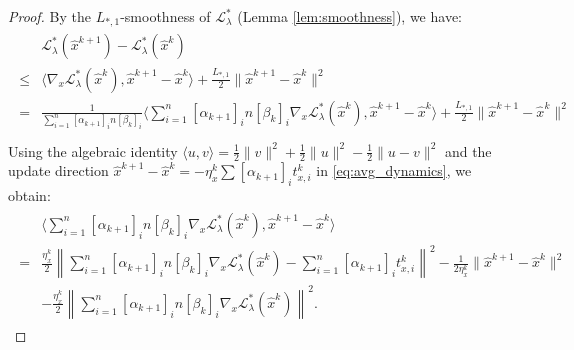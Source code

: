 \documentclass{article}
\theoremstyle{plain}
\theoremstyle{definition}
\theoremstyle{remark}
\begin{document}
\begin{proof}
By the $L_{*,1}$-smoothness of $\mathcal{L}_{\lambda}^{*}$ (Lemma \ref{lem:smoothness}), we have:
	\begin{align}\label{opt_Lag_de}
		\begin{aligned}
			&\mathcal{L}_{\lambda}^{*}(\hat{x}^{k+1})- \mathcal{L}_{\lambda}^{*}(\hat{x}^{k})\\
			\leq 
			& \langle\nabla_{x}\mathcal{L}_{\lambda}^{*}(\hat{x}^{k}),\hat{x}^{k+1}-\hat{x}^{k}\rangle+\frac{L_{*,1}}{2}\|\hat{x}^{k+1}-\hat{x}^{k}\|^{2}\\
			=
			&\frac{1}{\sum_{i=1}^{n}[\alpha_{k+1}]_{i} n[\beta_{k}]_{i}}\Big\langle\sum_{i=1}^{n}[\alpha_{k+1}]_{i} n[\beta_{k}]_{i}\nabla_{x}\mathcal{L}_{\lambda}^{*}(\hat{x}^{k}),\hat{x}^{k+1}-\hat{x}^{k}\Big\rangle+\frac{L_{*,1}}{2}\|\hat{x}^{k+1}-\hat{x}^{k}\|^{2}\\
		\end{aligned}
	\end{align}
Using the algebraic identity $\langle u, v \rangle = \frac{1}{2}\|v\|^2 + \frac{1}{2}\|u\|^2 - \frac{1}{2}\|u - v\|^2$ and the update direction $\hat{x}^{k+1} - \hat{x}^k = - \eta_x^k \sum [\alpha_{k+1}]_i t_{x,i}^k$ in \eqref{eq:avg_dynamics}, we obtain:
	\begin{align}\label{opt_Lag_de_1}
    \begin{aligned}
		&\Big\langle\sum_{i=1}^{n}[\alpha_{k+1}]_{i} n[\beta_{k}]_{i}\nabla_{x}\mathcal{L}_{\lambda}^{*}(\hat{x}^{k}),\hat{x}^{k+1}-\hat{x}^{k}\Big\rangle\\
		=
		&\frac{\eta_x^{k}}{2}\left\|\sum_{i=1}^{n}[\alpha_{k+1}]_{i} n[\beta_{k}]_{i}\nabla_{x}\mathcal{L}_{\lambda}^{*}(\hat{x}^{k})-\sum_{i=1}^n[\alpha_{k+1}]_it_{x,i}^k\right\|^{2}-\frac{1}{2\eta_x^{k}}\|\hat{x}^{k+1}-\hat{x}^{k}\|^{2}\\
        &- \frac{\eta_x^{k}}{2}\left\|\sum_{i=1}^{n}[\alpha_{k+1}]_{i} n[\beta_{k}]_{i}\nabla_{x}\mathcal{L}_{\lambda}^{*}(\hat{x}^{k}) \right\|^{2}.
        \end{aligned}
	\end{align}


\end{proof}
\end{document}
